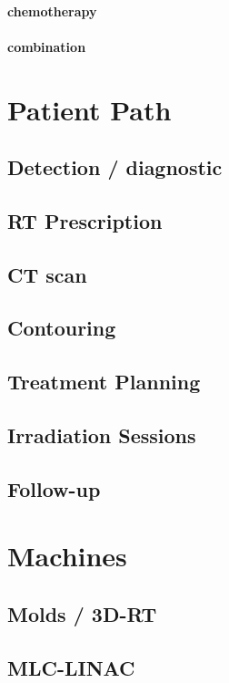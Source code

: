 \paragraph{chemotherapy}
\paragraph{combination}

\section{Patient Path}

\subsection{Detection / diagnostic}
\subsection{RT Prescription}
\subsection{CT scan}
\subsection{Contouring}
\subsection{Treatment Planning}
\subsection{Irradiation Sessions}
\subsection{Follow-up}

\section{Machines}
\subsection{Molds / 3D-RT}
\subsection{MLC-LINAC}
